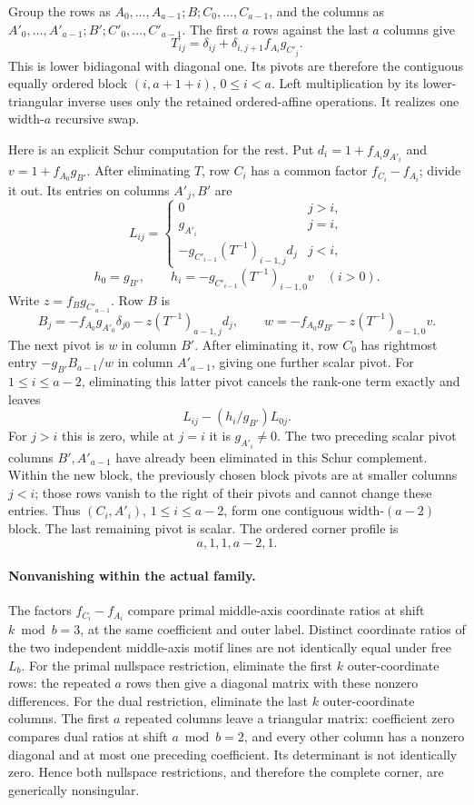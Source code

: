 Group the rows as $A_0,\ldots,A_{a-1};B;C_0,\ldots,C_{a-1}$,
and the columns as $A'_0,\ldots,A'_{a-1};B';C'_0,\ldots,C'_{a-1}$.
The first $a$ rows against the last $a$ columns give
\[
 T_{ij}=\delta_{ij}+\delta_{i,j+1}f_{A_i}g_{C'_j}.
\]
This is lower bidiagonal with diagonal one. Its pivots are therefore the
contiguous equally ordered block $(i,a+1+i)$, $0\le i<a$.
Left multiplication by its lower-triangular inverse uses only the retained
ordered-affine operations. It realizes one width-$a$ recursive swap.

Here is an explicit Schur computation for the rest. Put
$d_i=1+f_{A_i}g_{A'_i}$ and $v=1+f_{A_0}g_{B'}$.
After eliminating $T$, row $C_i$ has a common factor
$f_{C_i}-f_{A_i}$; divide it out. Its entries on columns $A'_j,B'$ are
\[
 L_{ij}=\begin{cases}
 0&j>i,\\ g_{A'_i}&j=i,\\
 -g_{C'_{i-1}}(T^{-1})_{i-1,j}d_j&j<i,
 \end{cases}
\]
\[
 h_0=g_{B'},\qquad
 h_i=-g_{C'_{i-1}}(T^{-1})_{i-1,0}v\quad(i>0).
\]
Write $z=f_Bg_{C'_{a-1}}$. Row $B$ is
\[
 B_j=-f_{A_0}g_{A'_0}\delta_{j0}
      -z(T^{-1})_{a-1,j}d_j,
\qquad
 w=-f_{A_0}g_{B'}-z(T^{-1})_{a-1,0}v.
\]
The next pivot is $w$ in column $B'$. After eliminating it,
row $C_0$ has rightmost entry
$-g_{B'}B_{a-1}/w$ in column $A'_{a-1}$, giving one further scalar pivot.
For $1\le i\le a-2$, eliminating this latter pivot cancels the rank-one
term exactly and leaves
\[
 L_{ij}-(h_i/g_{B'})L_{0j}.
\]
For $j>i$ this is zero, while at $j=i$ it is $g_{A'_i}\ne0$.
The two preceding scalar pivot columns $B\prime,A\prime_{a-1}$ have
already been eliminated in this Schur complement. Within the new block,
the previously chosen block pivots are at smaller columns $j<i$; those
rows vanish to the right of their pivots and cannot change these entries.
Thus $(C_i,A'_i)$, $1\le i\le a-2$, form one contiguous width-$(a-2)$
block. The last remaining pivot is scalar. The ordered corner profile is
\[
 a,1,1,a-2,1.
\]

\paragraph{Nonvanishing within the actual family.}
The factors $f_{C_i}-f_{A_i}$ compare primal middle-axis coordinate ratios
at shift $k\bmod b=3$, at the same coefficient and outer label. Distinct
coordinate ratios of the two independent middle-axis motif lines are
not identically equal under free $L_b$. For the primal nullspace
restriction, eliminate the first $k$ outer-coordinate rows: the repeated
$a$ rows then give a diagonal matrix with these nonzero differences.
For the dual restriction, eliminate the last $k$ outer-coordinate columns.
The first $a$ repeated columns leave a triangular matrix: coefficient zero
compares dual ratios at shift $a\bmod b=2$, and every other column has a
nonzero diagonal and at most one preceding coefficient. Its determinant
is not identically zero. Hence both nullspace restrictions, and therefore
the complete corner, are generically nonsingular.

